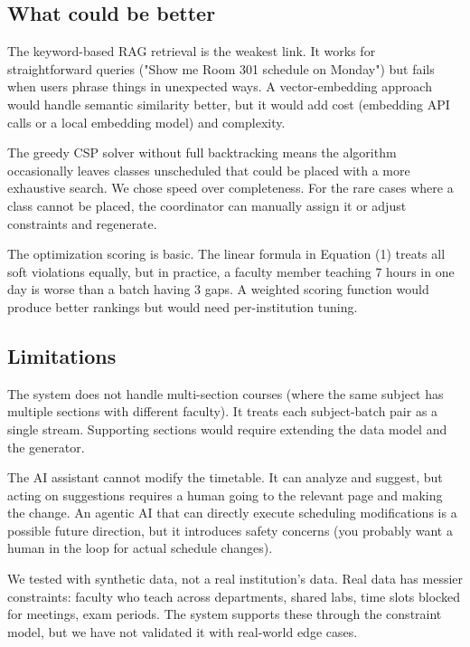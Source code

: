 \documentclass[conference]{IEEEtran}
\begin{document}
\subsection{What could be better}

The keyword-based RAG retrieval is the weakest link. It works for straightforward queries ("Show me Room 301 schedule on Monday") but fails when users phrase things in unexpected ways. A vector-embedding approach would handle semantic similarity better, but it would add cost (embedding API calls or a local embedding model) and complexity.

The greedy CSP solver without full backtracking means the algorithm occasionally leaves classes unscheduled that could be placed with a more exhaustive search. We chose speed over completeness. For the rare cases where a class cannot be placed, the coordinator can manually assign it or adjust constraints and regenerate.

The optimization scoring is basic. The linear formula in Equation (1) treats all soft violations equally, but in practice, a faculty member teaching 7 hours in one day is worse than a batch having 3 gaps. A weighted scoring function would produce better rankings but would need per-institution tuning.

\subsection{Limitations}

The system does not handle multi-section courses (where the same subject has multiple sections with different faculty). It treats each subject-batch pair as a single stream. Supporting sections would require extending the data model and the generator.

The AI assistant cannot modify the timetable. It can analyze and suggest, but acting on suggestions requires a human going to the relevant page and making the change. An agentic AI that can directly execute scheduling modifications is a possible future direction, but it introduces safety concerns (you probably want a human in the loop for actual schedule changes).

We tested with synthetic data, not a real institution's data. Real data has messier constraints: faculty who teach across departments, shared labs, time slots blocked for meetings, exam periods. The system supports these through the constraint model, but we have not validated it with real-world edge cases.
\end{document}
